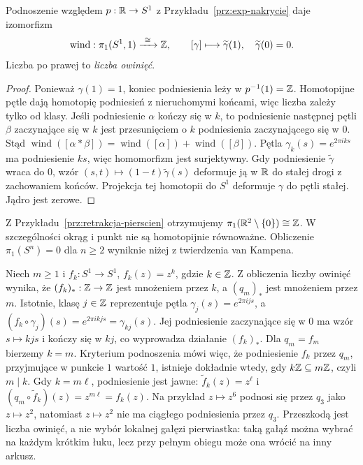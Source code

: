 \begin{twierdzenie}
\label{thm:pi1-okragu}
Podnoszenie względem $p:\mathbb{R}\to S^1$
z Przykładu~\ref{prz:exp-nakrycie} daje
izomorfizm
\[
 \operatorname{wind}:\pi_1(S^1,1)\xrightarrow{\ \cong\ }\Z,
 \qquad [\gamma]\longmapsto
 \widetilde\gamma(1),
 \quad \widetilde\gamma(0)=0.
\]
Liczba po prawej to \emph{liczba owinięć}.
\end{twierdzenie}
\begin{proof}
Ponieważ $\gamma(1)=1$, koniec
podniesienia leży w $p^{-1}(1)=\mathbb{Z}$.
Homotopijne pętle dają homotopię
podniesień z nieruchomymi końcami,
więc liczba zależy tylko od klasy.
Jeśli podniesienie $\alpha$ kończy się w $k$,
to podniesienie następnej pętli $\beta$
zaczynające się w $k$ jest przesunięciem
o $k$ podniesienia zaczynającego się w $0$.
Stąd $\operatorname{wind}([\alpha*\beta])
=\operatorname{wind}([\alpha])
+\operatorname{wind}([\beta])$.
Pętla $\gamma_k(s)=e^{2\pi i ks}$
ma podniesienie $ks$, więc homomorfizm
jest surjektywny. Gdy podniesienie
$\widetilde\gamma$ wraca do $0$,
wzór $(s,t)\mapsto(1-t)\widetilde\gamma(s)$
deformuje ją w $\mathbb{R}$ do stałej drogi
z zachowaniem końców. Projekcja tej
homotopii do $S^1$ deformuje $\gamma$
do pętli stałej. Jądro jest zerowe.
\end{proof}

Z Przykładu~\ref{prz:retrakcja-pierscien}
otrzymujemy $\pi_1(\mathbb{R}^2\setminus\{0\})\cong\mathbb{Z}$.
W szczególności okrąg i punkt nie są
homotopijnie równoważne. Obliczenie
$\pi_1(S^{n})=0$ dla $n\geq2$
wyniknie niżej z twierdzenia van Kampena.

\begin{przyklad}
\label{prz:podnoszenie-poteg}
Niech $m\geq1$ i $f_k:S^1\to S^1$, $f_k(z)=z^k$,
gdzie $k\in\mathbb{Z}$. Z obliczenia liczby owinięć wynika, że
$(f_k)_*:\mathbb{Z}\to\mathbb{Z}$ jest mnożeniem przez $k$, a
$(q_m)_*$ jest mnożeniem przez $m$.
Istotnie, klasę $j\in\mathbb{Z}$ reprezentuje pętla
$\gamma_j(s)=e^{2\pi ijs}$, a
$(f_k\circ\gamma_j)(s)=e^{2\pi ikjs}=\gamma_{kj}(s)$.
Jej podniesienie zaczynające się w $0$ ma wzór $s\mapsto kjs$
i kończy się w $kj$, co wyprowadza działanie $(f_k)_*$.
Dla $q_m=f_m$ bierzemy $k=m$. Kryterium
podnoszenia mówi więc, że podniesienie $f_k$ przez
$q_m$, przyjmujące w punkcie $1$ wartość $1$, istnieje
dokładnie wtedy, gdy $k\mathbb{Z}\subseteq m\mathbb{Z}$, czyli $m\mid k$.
Gdy $k=m\ell$, podniesienie jest jawne:
$\widetilde f_k(z)=z^\ell$ i
$(q_m\circ\widetilde f_k)(z)=z^{m\ell}=f_k(z)$.
Na przykład $z\mapsto z^6$ podnosi się przez $q_3$
jako $z\mapsto z^2$, natomiast $z\mapsto z^2$
nie ma ciągłego podniesienia przez $q_3$.
Przeszkodą jest liczba owinięć, a nie wybór lokalnej
gałęzi pierwiastka: taką gałąź można wybrać na każdym
krótkim łuku, lecz przy pełnym obiegu może ona wrócić
na inny arkusz.
\end{przyklad}

